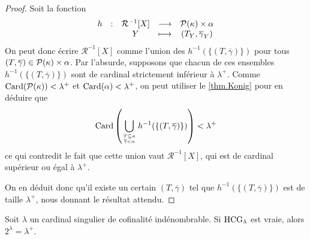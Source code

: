 \begin{proof}
  Soit la fonction
  \[\begin{array}{ccccc}
  h & : & \mathcal R^{-1}[X] & \longrightarrow & \mathcal{P}(\kappa)\times\alpha\\
  & & Y & \longmapsto & (T_Y,\overline\gamma_Y)
  \end{array}\]
  On peut donc écrire $\mathcal R^{-1}[X]$ comme l'union des
  $h^{-1}(\{(T,\overline\gamma)\})$ pour tous
  $(T,\overline\gamma)\in\mathcal{P}(\kappa)\times\alpha$. Par l'absurde,
  supposons que chacun de ces ensembles $h^{-1}(\{(T,\overline\gamma)\})$ sont
  de cardinal strictement inférieur à $\lambda^+$. Comme
  $\operatorname{Card}(\mathcal{P}(\kappa)) < \lambda^+$ et $\operatorname{Card}(\alpha) < \lambda^+$, on
  peut utiliser le \cref{thm.Konig} pour en déduire que
  \[\Card\left(
  \bigcup_{\genfrac{}{}{0pt}{2}{T\subseteq \kappa}{\overline\gamma\in \alpha}}
  h^{-1}(\{(T,\overline\gamma)\})\right) < \lambda^+\]
  ce qui contredit le fait que cette union vaut $\mathcal R^{-1}[X]$, qui est
  de cardinal supérieur ou égal à $\lambda^+$.

  On en déduit donc qu'il existe un certain $(T,\overline\gamma)$ tel que
  $h^{-1}(\{(T,\overline\gamma)\})$ est de taille $\lambda^+$, nous donnant le
  résultat attendu.
\end{proof}

\begin{theorem}
  Soit $\lambda$ un cardinal singulier de cofinalité indénombrable. Si
  $\operatorname{HCG}_\lambda$ est vraie, alors $2^\lambda = \lambda^+$.
\end{theorem}


